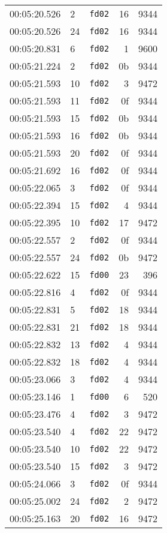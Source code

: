 \documentclass{article}
\begin{document}
\begin{longtable}{lllrr}
00:05:20.526 & 2 & \texttt{fd02} & 16 & 9344 \\
00:05:20.526 & 24 & \texttt{fd02} & 16 & 9344 \\
00:05:20.831 & 6 & \texttt{fd02} & 1 & 9600 \\
00:05:21.224 & 2 & \texttt{fd02} & 0b & 9344 \\
00:05:21.593 & 10 & \texttt{fd02} & 3 & 9472 \\
00:05:21.593 & 11 & \texttt{fd02} & 0f & 9344 \\
00:05:21.593 & 15 & \texttt{fd02} & 0b & 9344 \\
00:05:21.593 & 16 & \texttt{fd02} & 0b & 9344 \\
00:05:21.593 & 20 & \texttt{fd02} & 0f & 9344 \\
00:05:21.692 & 16 & \texttt{fd02} & 0f & 9344 \\
00:05:22.065 & 3 & \texttt{fd02} & 0f & 9344 \\
00:05:22.394 & 15 & \texttt{fd02} & 4 & 9344 \\
00:05:22.395 & 10 & \texttt{fd02} & 17 & 9472 \\
00:05:22.557 & 2 & \texttt{fd02} & 0f & 9344 \\
00:05:22.557 & 24 & \texttt{fd02} & 0b & 9472 \\
00:05:22.622 & 15 & \texttt{fd00} & 23 & 396 \\
00:05:22.816 & 4 & \texttt{fd02} & 0f & 9344 \\
00:05:22.831 & 5 & \texttt{fd02} & 18 & 9344 \\
00:05:22.831 & 21 & \texttt{fd02} & 18 & 9344 \\
00:05:22.832 & 13 & \texttt{fd02} & 4 & 9344 \\
00:05:22.832 & 18 & \texttt{fd02} & 4 & 9344 \\
00:05:23.066 & 3 & \texttt{fd02} & 4 & 9344 \\
00:05:23.146 & 1 & \texttt{fd00} & 6 & 520 \\
00:05:23.476 & 4 & \texttt{fd02} & 3 & 9472 \\
00:05:23.540 & 4 & \texttt{fd02} & 22 & 9472 \\
00:05:23.540 & 10 & \texttt{fd02} & 22 & 9472 \\
00:05:23.540 & 15 & \texttt{fd02} & 3 & 9472 \\
00:05:24.066 & 3 & \texttt{fd02} & 0f & 9344 \\
00:05:25.002 & 24 & \texttt{fd02} & 2 & 9472 \\
00:05:25.163 & 20 & \texttt{fd02} & 16 & 9472 \\

\end{longtable}
\end{document}

